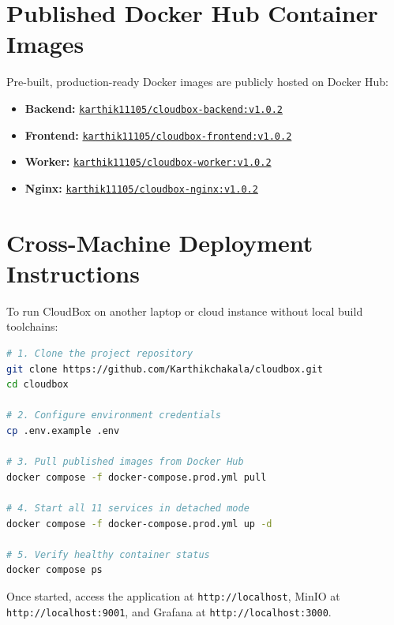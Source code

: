 \documentclass[11pt,a4paper]{report}
\begin{document}
\section{Published Docker Hub Container Images}
Pre-built, production-ready Docker images are publicly hosted on Docker Hub:
\begin{itemize}[itemsep=1pt,topsep=1pt]
    \item \textbf{Backend:} \href{https://hub.docker.com/r/karthik11105/cloudbox-backend}{\texttt{karthik11105/cloudbox-backend:v1.0.2}}
    \item \textbf{Frontend:} \href{https://hub.docker.com/r/karthik11105/cloudbox-frontend}{\texttt{karthik11105/cloudbox-frontend:v1.0.2}}
    \item \textbf{Worker:} \href{https://hub.docker.com/r/karthik11105/cloudbox-worker}{\texttt{karthik11105/cloudbox-worker:v1.0.2}}
    \item \textbf{Nginx:} \href{https://hub.docker.com/r/karthik11105/cloudbox-nginx}{\texttt{karthik11105/cloudbox-nginx:v1.0.2}}
\end{itemize}

\section{Cross-Machine Deployment Instructions}
To run CloudBox on another laptop or cloud instance without local build toolchains:

\begin{lstlisting}[language=bash]
# 1. Clone the project repository
git clone https://github.com/Karthikchakala/cloudbox.git
cd cloudbox

# 2. Configure environment credentials
cp .env.example .env

# 3. Pull published images from Docker Hub
docker compose -f docker-compose.prod.yml pull

# 4. Start all 11 services in detached mode
docker compose -f docker-compose.prod.yml up -d

# 5. Verify healthy container status
docker compose ps
\end{lstlisting}
Once started, access the application at \texttt{http://localhost}, MinIO at \texttt{http://localhost:9001}, and Grafana at \texttt{http://localhost:3000}.

\clearpage

\end{document}
